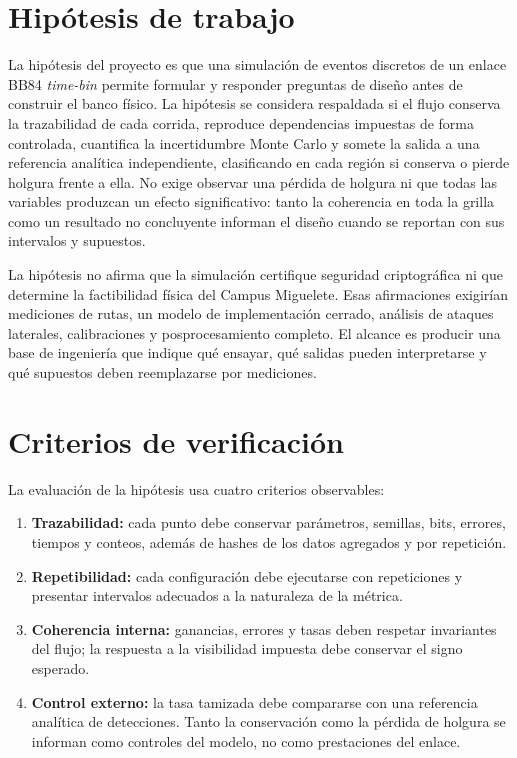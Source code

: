 \section{Hipótesis de trabajo}

La hipótesis del proyecto es que una simulación de eventos discretos de un enlace BB84 \textit{time-bin} permite formular y responder preguntas de diseño antes de construir el banco físico. La hipótesis se considera respaldada si el flujo conserva la trazabilidad de cada corrida, reproduce dependencias impuestas de forma controlada, cuantifica la incertidumbre Monte Carlo y somete la salida a una referencia analítica independiente, clasificando en cada región si conserva o pierde holgura frente a ella. No exige observar una pérdida de holgura ni que todas las variables produzcan un efecto significativo: tanto la coherencia en toda la grilla como un resultado no concluyente informan el diseño cuando se reportan con sus intervalos y supuestos.

La hipótesis no afirma que la simulación certifique seguridad criptográfica ni que determine la factibilidad física del Campus Miguelete. Esas afirmaciones exigirían mediciones de rutas, un modelo de implementación cerrado, análisis de ataques laterales, calibraciones y posprocesamiento completo. El alcance es producir una base de ingeniería que indique qué ensayar, qué salidas pueden interpretarse y qué supuestos deben reemplazarse por mediciones.

\section{Criterios de verificación}

La evaluación de la hipótesis usa cuatro criterios observables:

\begin{enumerate}
  \item \textbf{Trazabilidad:} cada punto debe conservar parámetros, semillas, bits, errores, tiempos y conteos, además de hashes de los datos agregados y por repetición.
  \item \textbf{Repetibilidad:} cada configuración debe ejecutarse con \PThreeRepetitions{} repeticiones y presentar intervalos adecuados a la naturaleza de la métrica.
  \item \textbf{Coherencia interna:} ganancias, errores y tasas deben respetar invariantes del flujo; la respuesta a la visibilidad impuesta debe conservar el signo esperado.
  \item \textbf{Control externo:} la tasa tamizada debe compararse con una referencia analítica de detecciones. Tanto la conservación como la pérdida de holgura se informan como controles del modelo, no como prestaciones del enlace.
\end{enumerate}

